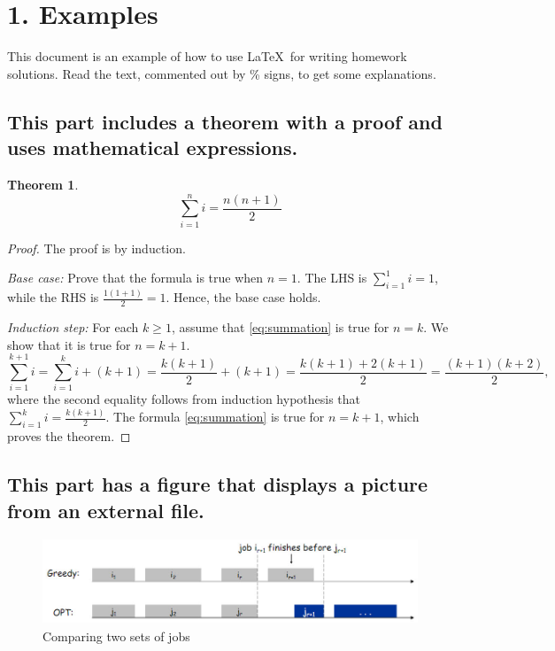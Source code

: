 \documentclass[11pt]{537homework}
\author{Alice P. Hacker}
\newtheorem{theorem}{Theorem}
\begin{document}
\section*{1. Examples}
This document is an example of how to use \LaTeX\ for writing homework solutions. Read the text, commented out by \% signs, to get some explanations.

\subsection{This part includes a theorem with a proof and uses mathematical expressions.}
\begin{theorem}
\begin{equation}
  \sum_{i=1}^n i = \frac{n(n+1)}{2}
  \label{eq:summation}
\end{equation}
\end{theorem}
\begin{proof} The proof is by induction.

\noindent\textsl{Base case:} Prove that the formula is true when $n=1$.
The LHS is $\sum_{i=1}^1 i=1$, while the RHS is
$\frac{1(1+1)}{2} = 1$. Hence, the base case holds.

\noindent\textsl{Induction step:} For each $k\geq 1$, assume that \eqref{eq:summation} is true for $n=k$. We show that it is true
for $n=k+1$.
\begin{equation*}
  \sum_{i=1}^{k+1} i = \sum_{i=1}^k i + (k+1) =
  \frac{k(k+1)}{2} + (k+1) =
  \frac{k(k+1) + 2(k+1)}{2} = \frac{(k+1)(k+2)}{2},
\end{equation*}
where the second equality follows from induction hypothesis that
$\sum_{i=1}^k i = \frac{k(k+1)}{2}$.
The formula \eqref{eq:summation} is true for $n=k+1$, which proves the
theorem.
\end{proof}

\subsection{This part has a figure that displays a picture from an external file.}
\begin{figure}[h]
  \centering
  \includegraphics[height=1in]{example-hw-image.jpg}
 \caption{Comparing two sets of jobs}
\end{figure}
\end{document}
